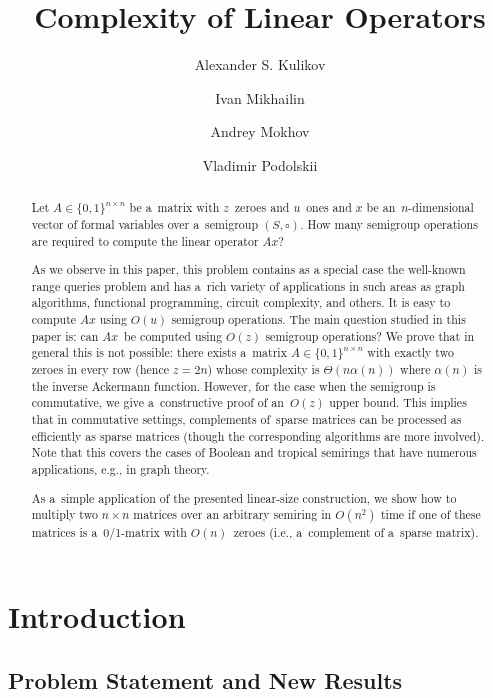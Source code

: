 \documentclass[a4paper,UKenglish,cleveref, autoref]{lipics-v2019}
\author{Alexander S. Kulikov}{Steklov Mathematical Institute at St.~Petersburg, Russian Academy of Sciences}{kulikov@logic.pdmi.ras.ru}{}{}
\author{Ivan Mikhailin}{University of California, San Diego}{imikhail@eng.ucsd.edu}{}{}
\author{Andrey Mokhov}{School of Engineering, Newcastle University, UK}{andrey.mokhov@ncl.ac.uk}{}{}
\author{Vladimir Podolskii}{Steklov Mathematical Institute, Russian Academy of Sciences \and National Research University Higher School of Economics, Moscow}{podolskii@mi-ras.ru}{}{}
\title{Complexity of Linear Operators}
\begin{document}
\maketitle

\begin{abstract}
Let $A \in \{0,1\}^{n \times n}$ be a~matrix with $z$~zeroes
and $u$~ones and $x$ be an~$n$-dimensional vector of
formal variables over a~semigroup $(S, \circ)$.
How many semigroup operations are required to compute the linear operator $Ax$?

As we observe in this paper, this problem contains as a special case the well-known
range queries problem and has a~rich variety of applications in
such areas as graph algorithms, functional programming, circuit complexity,
and others. It is easy to compute $Ax$ using $O(u)$ semigroup
operations.
The main question studied in this paper is:
can $Ax$~be computed using $O(z)$ semigroup operations?
We prove that in general this is not possible: there exists
a~matrix $A \in \{0,1\}^{n \times n}$ with exactly two zeroes in every row
(hence $z=2n$) whose complexity is $\Theta(n\alpha(n))$
where $\alpha(n)$ is the inverse Ackermann function.
However, for the case when the semigroup is commutative,
we give a~constructive proof of an~$O(z)$ upper bound.
This implies that in commutative settings, complements of~sparse
matrices can
be processed as efficiently as sparse matrices (though the
corresponding
algorithms are more involved). Note that this covers the
cases of Boolean and tropical semirings that have numerous
applications, e.g., in graph theory.

As a~simple application of the presented linear-size construction,
we show
how to multiply two $n\times n$ matrices over an arbitrary
semiring in $O(n^2)$
time if one of these matrices is a~0/1-matrix with $O(n)$~zeroes
(i.e., a~complement of a~sparse matrix).
\end{abstract}


\section{Introduction}
\subsection{Problem Statement and New Results}
\end{document}
